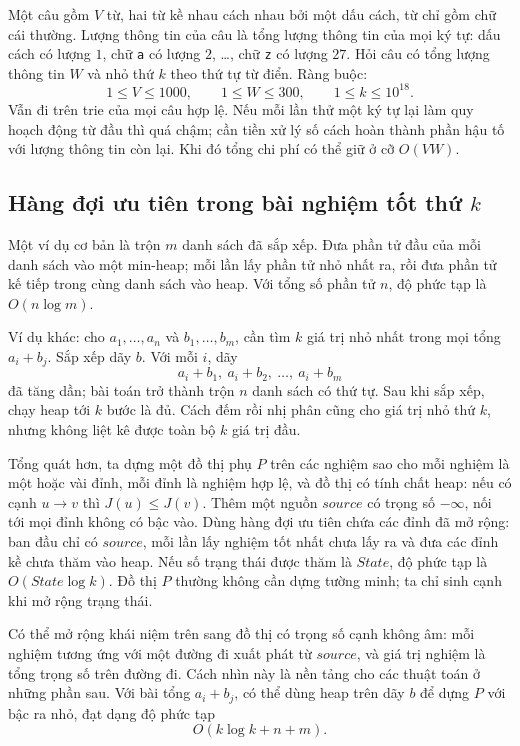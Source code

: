 \documentclass[11pt]{article}
\begin{document}
Một câu gồm \(V\) từ, hai từ kề nhau cách nhau bởi một dấu cách, từ chỉ gồm chữ
cái thường. Lượng thông tin của câu là tổng lượng thông tin của mọi ký tự:
dấu cách có lượng \(1\), chữ \texttt{a} có lượng \(2\), \ldots, chữ
\texttt{z} có lượng \(27\). Hỏi câu có tổng lượng thông tin \(W\) và nhỏ thứ
\(k\) theo thứ tự từ điển. Ràng buộc:
\[
  1\le V\le 1000,\qquad 1\le W\le 300,\qquad 1\le k\le 10^{18}.
\]
Vẫn đi trên trie của mọi câu hợp lệ. Nếu mỗi lần thử một ký tự lại làm quy
hoạch động từ đầu thì quá chậm; cần tiền xử lý số cách hoàn thành phần hậu tố
với lượng thông tin còn lại. Khi đó tổng chi phí có thể giữ ở cỡ \(O(VW)\).

\subsection{Hàng đợi ưu tiên trong bài nghiệm tốt thứ \texorpdfstring{\(k\)}{k}}

Một ví dụ cơ bản là trộn \(m\) danh sách đã sắp xếp. Đưa phần tử đầu của mỗi
danh sách vào một min-heap; mỗi lần lấy phần tử nhỏ nhất ra, rồi đưa phần tử kế
tiếp trong cùng danh sách vào heap. Với tổng số phần tử \(n\), độ phức tạp là
\(O(n\log m)\).

Ví dụ khác: cho \(a_1,\ldots,a_n\) và \(b_1,\ldots,b_m\), cần tìm \(k\) giá trị
nhỏ nhất trong mọi tổng \(a_i+b_j\). Sắp xếp dãy \(b\). Với mỗi \(i\), dãy
\[
  a_i+b_1,\ a_i+b_2,\ \ldots,\ a_i+b_m
\]
đã tăng dần; bài toán trở thành trộn \(n\) danh sách có thứ tự. Sau khi sắp
xếp, chạy heap tới \(k\) bước là đủ. Cách đếm rồi nhị phân cũng cho giá trị
nhỏ thứ \(k\), nhưng không liệt kê được toàn bộ \(k\) giá trị đầu.

Tổng quát hơn, ta dựng một đồ thị phụ \(P\) trên các nghiệm sao cho mỗi nghiệm
là một hoặc vài đỉnh, mỗi đỉnh là nghiệm hợp lệ, và đồ thị có tính chất heap:
nếu có cạnh \(u\to v\) thì \(J(u)\le J(v)\). Thêm một nguồn
\(\mathit{source}\) có trọng số \(-\infty\), nối tới mọi đỉnh không có bậc vào.
Dùng hàng đợi ưu tiên chứa các đỉnh đã mở rộng: ban đầu chỉ có
\(\mathit{source}\), mỗi lần lấy nghiệm tốt nhất chưa lấy ra và đưa các đỉnh
kề chưa thăm vào heap. Nếu số trạng thái được thăm là \(\mathit{State}\), độ
phức tạp là \(O(\mathit{State}\log k)\). Đồ thị \(P\) thường không cần dựng
tường minh; ta chỉ sinh cạnh khi mở rộng trạng thái.

Có thể mở rộng khái niệm trên sang đồ thị có trọng số cạnh không âm: mỗi nghiệm
tương ứng với một đường đi xuất phát từ \(\mathit{source}\), và giá trị nghiệm
là tổng trọng số trên đường đi. Cách nhìn này là nền tảng cho các thuật toán ở
những phần sau. Với bài tổng \(a_i+b_j\), có thể dùng heap trên dãy \(b\) để
dựng \(P\) với bậc ra nhỏ, đạt dạng độ phức tạp
\[
  O(k\log k+n+m).
\]
\end{document}
